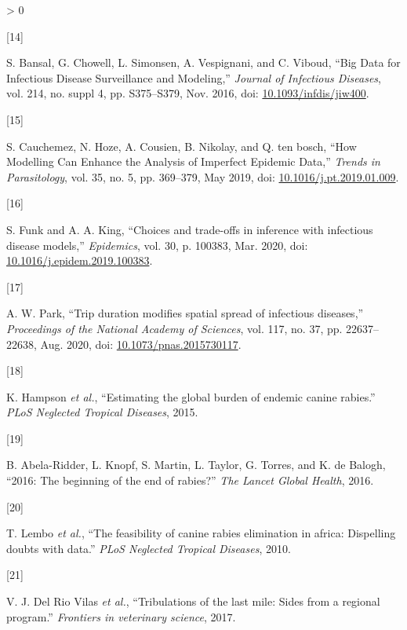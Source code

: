 \documentclass[
  oneside]{book}
\newlength{\cslhangindent}
\newlength{\csllabelwidth}
\newenvironment{CSLReferences}[2] %
 {%
  \setlength{\parindent}{0pt}
  \ifodd #1 \everypar{\setlength{\hangindent}{\cslhangindent}}\ignorespaces\fi
  \ifnum #2 > 0
  \setlength{\parskip}{#2\baselineskip}
  \fi
 }%
 {}
\newcommand{\CSLLeftMargin}[1]{\parbox[t]{\csllabelwidth}{#1}}
\newcommand{\CSLRightInline}[1]{\parbox[t]{\linewidth - \csllabelwidth}{#1}\break}
\begin{document}
\begin{CSLReferences}{0}{0}
\leavevmode\hypertarget{ref-bansal2016}{}%
\CSLLeftMargin{{[}14{]} }
\CSLRightInline{S. Bansal, G. Chowell, L. Simonsen, A. Vespignani, and C. Viboud, {``Big Data for Infectious Disease Surveillance and Modeling,''} \emph{Journal of Infectious Diseases}, vol. 214, no. suppl 4, pp. S375--S379, Nov. 2016, doi: \href{https://doi.org/10.1093/infdis/jiw400}{10.1093/infdis/jiw400}.}

\leavevmode\hypertarget{ref-cauchemez2019}{}%
\CSLLeftMargin{{[}15{]} }
\CSLRightInline{S. Cauchemez, N. Hoze, A. Cousien, B. Nikolay, and Q. ten bosch, {``How Modelling Can Enhance the Analysis of Imperfect Epidemic Data,''} \emph{Trends in Parasitology}, vol. 35, no. 5, pp. 369--379, May 2019, doi: \href{https://doi.org/10.1016/j.pt.2019.01.009}{10.1016/j.pt.2019.01.009}.}

\leavevmode\hypertarget{ref-funk2020}{}%
\CSLLeftMargin{{[}16{]} }
\CSLRightInline{S. Funk and A. A. King, {``Choices and trade-offs in inference with infectious disease models,''} \emph{Epidemics}, vol. 30, p. 100383, Mar. 2020, doi: \href{https://doi.org/10.1016/j.epidem.2019.100383}{10.1016/j.epidem.2019.100383}.}

\leavevmode\hypertarget{ref-park2020}{}%
\CSLLeftMargin{{[}17{]} }
\CSLRightInline{A. W. Park, {``Trip duration modifies spatial spread of infectious diseases,''} \emph{Proceedings of the National Academy of Sciences}, vol. 117, no. 37, pp. 22637--22638, Aug. 2020, doi: \href{https://doi.org/10.1073/pnas.2015730117}{10.1073/pnas.2015730117}.}

\leavevmode\hypertarget{ref-hampson2015}{}%
\CSLLeftMargin{{[}18{]} }
\CSLRightInline{K. Hampson \emph{et al.}, {``Estimating the global burden of endemic canine rabies.''} \emph{PLoS Neglected Tropical Diseases}, 2015.}

\leavevmode\hypertarget{ref-abela-ridder2016}{}%
\CSLLeftMargin{{[}19{]} }
\CSLRightInline{B. Abela-Ridder, L. Knopf, S. Martin, L. Taylor, G. Torres, and K. de Balogh, {``2016: The beginning of the end of rabies?''} \emph{The Lancet Global Health}, 2016.}

\leavevmode\hypertarget{ref-lembo2010}{}%
\CSLLeftMargin{{[}20{]} }
\CSLRightInline{T. Lembo \emph{et al.}, {``The feasibility of canine rabies elimination in africa: Dispelling doubts with data.''} \emph{PLoS Neglected Tropical Diseases}, 2010.}

\leavevmode\hypertarget{ref-delriovilas2017}{}%
\CSLLeftMargin{{[}21{]} }
\CSLRightInline{V. J. Del Rio Vilas \emph{et al.}, {``Tribulations of the last mile: Sides from a regional program.''} \emph{Frontiers in veterinary science}, 2017.}


\end{CSLReferences}
\end{document}
